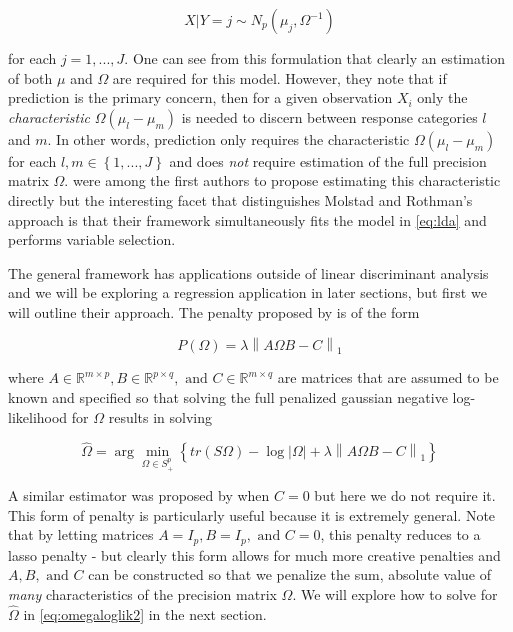 \documentclass[11pt,]{report}
\theoremstyle{definition}
\theoremstyle{definition}
\theoremstyle{definition}
\theoremstyle{remark}
\begin{document}
\begin{equation}
X | Y = j \sim N_{p}\left(\mu_{j}, \Omega^{-1}\right)
\label{eq:lda}
\end{equation}

for each \(j = 1, ..., J\). One can see from this formulation that clearly an estimation of both \(\mu\) and \(\Omega\) are required for this model. However, they note that if prediction is the primary concern, then for a given observation \(X_{i}\) only the \emph{characteristic} \(\Omega\left(\mu_{l} - \mu_{m}\right)\) is needed to discern between response categories \(l\) and \(m\). In other words, prediction only requires the characteristic \(\Omega\left(\mu_{l} - \mu_{m}\right)\) for each \(l, m \in \left\{1, ..., J\right\}\) and does \emph{not} require estimation of the full precision matrix \(\Omega\). \citet{cai2011direct} were among the first authors to propose estimating this characteristic directly but the interesting facet that distinguishes Molstad and Rothman's approach is that their framework simultaneously fits the model in \eqref{eq:lda} and performs variable selection.

The general framework has applications outside of linear discriminant analysis and we will be exploring a regression application in later sections, but first we will outline their approach. The penalty proposed by \citet{molstad2017shrinking} is of the form

\begin{equation}
P\left(\Omega\right) = \lambda\left\| A\Omega B - C \right\|_{1}
\label{eq:pen2}
\end{equation}

where \(A \in \mathbb{R}^{m \times p}, B \in \mathbb{R}^{p \times q}, \mbox{ and } C \in \mathbb{R}^{m \times q}\) are matrices that are assumed to be known and specified so that solving the full penalized gaussian negative log-likelihood for \(\Omega\) results in solving

\begin{equation}
\hat{\Omega} = \arg\min_{\Omega \in S_{+}^{p}}\left\{ tr\left(S\Omega\right) - \log\left|\Omega \right| + \lambda\left\| A\Omega B - C \right\|_{1} \right\}
\label{eq:omegaloglik2}
\end{equation}

A similar estimator was proposed by \citet{dalal2017sparse} when \(C = 0\) but here we do not require it. This form of penalty is particularly useful because it is extremely general. Note that by letting matrices \(A = I_{p}, B = I_{p}, \mbox{ and } C = 0\), this penalty reduces to a lasso penalty - but clearly this form allows for much more creative penalties and \(A, B, \mbox{ and } C\) can be constructed so that we penalize the sum, absolute value of \emph{many} characteristics of the precision matrix \(\Omega\). We will explore how to solve for \(\hat{\Omega}\) in \eqref{eq:omegaloglik2} in the next section.
\end{document}
